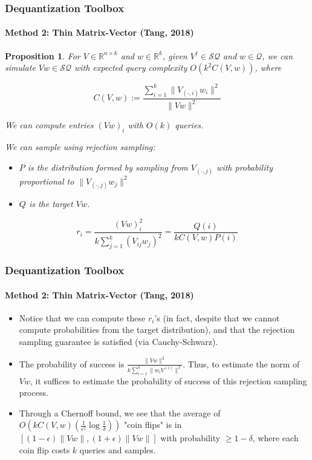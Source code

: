 \documentclass{beamer}
\newcommand\0{\mathbf{0}}
\newcommand\RR{\mathbb{R}}
\newcommand\<{\langle}
\renewcommand\>{\rangle}
\newtheorem{proposition}{Proposition}[theorem]
\begin{document}
\begin{frame}
\frametitle{Dequantization Toolbox}
\framesubtitle{Method 2: Thin Matrix-Vector (Tang, 2018)}
\begin{proposition}
	 For $V \in \RR^{n\times k}$ and $w \in \RR^k$, given $V^\dag \in \mathcal{SQ}$ and $w \in \mathcal{Q}$, we can simulate $Vw \in \mathcal{SQ}$ with expected query complexity $O(k^2C(V,w))$, where

$$C(V,w) := \frac{\sum_{i=1}^k\|V_{(\cdot, i)}w_i\|^2}{\|Vw\|^2}$$

We can compute entries $(Vw)_i$ with $O(k)$ queries.

We can sample using rejection sampling:

\begin{itemize}
\item $P$ is the distribution formed by sampling from $V_{(\cdot, j)}$ with probability proportional to $\|V_{(\cdot, j)}w_j\|^2$
  
\item $Q$ is the target $Vw$.
\end{itemize}

$$r_i = \frac{(Vw)_i^2}{k \sum_{j=1}^k (V_{ij}w_j)^2} = \frac{Q(i)}{kC(V,w)P(i)}$$
\end{proposition}
\end{frame}

\begin{frame}
\frametitle{Dequantization Toolbox}
\framesubtitle{Method 2: Thin Matrix-Vector (Tang, 2018)}
\begin{itemize}
\item Notice that we can compute these $r_i$'s (in fact, despite that we cannot compute probabilities from the target distribution), and that the rejection sampling guarantee is satisfied (via Cauchy-Schwarz).

\item The probability of success is $\frac{\|Vw\|^2}{k\sum_{i=1}^k\|w_iV^{(i)}\|^2}$. Thus, to estimate the norm of $Vw$, it suffices to estimate the probability of success of this rejection sampling process.

\item Through a Chernoff bound, we see that the average of $O(kC(V,w)(\frac{1}{\epsilon^2}\log\frac{1}{\delta}))$ "coin flips" is in $[(1-\epsilon)\|Vw\|,(1+\epsilon)\|Vw\|]$ with probability $\geq 1-\delta$, where each coin flip costs $k$ queries and samples.	
\end{itemize}
\end{frame}
\end{document}
